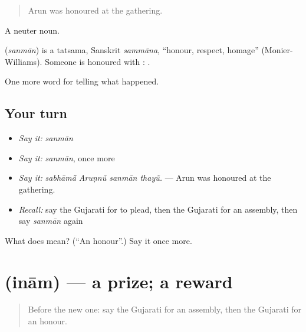 \begin{quote}
Arun was honoured at the gathering.
\end{quote}

A neuter noun.

\begin{cousinweb}
\textbf{} (\emph{sanmān}) is a tatsama, Sanskrit \emph{sammāna}, \textquotedblleft{}honour, respect, homage\textquotedblright{} (Monier-Williams). Someone is honoured with \textbf{}: \textbf{  }.
\end{cousinweb}

\begin{grammarlens}[title={What you've built}]
One more word for telling what happened.
\end{grammarlens}

\subsection*{Your turn}
\begin{itemize}
\raggedright
  \item \emph{Say it:} \emph{sanmān}
  \item \emph{Say it:} \emph{sanmān}, once more
  \item \emph{Say it:} \emph{sabhāmā̃ Aruṇnũ sanmān thayũ.} — Arun was honoured at the gathering.
  \item \emph{Recall:} say the Gujarati for to plead, then the Gujarati for an assembly, then say \emph{sanmān} again
\end{itemize}

\begin{tcolorbox}[breakable,colback=teal!4,colframe=teal!35!black,title={Before you move on}]
What does  mean? (\textquotedblleft{}An honour\textquotedblright{}.) Say it once more.
\end{tcolorbox}
\section[\texorpdfstring{\gu{ઇનામ} (inām)}{ઇનામ (inām)}]{ (inām) — a prize; a reward}

\label{lesson:GU-C309-inam}



\begin{quote}
Before the new one: say the Gujarati for an assembly, then the Gujarati for an honour.
\end{quote}

